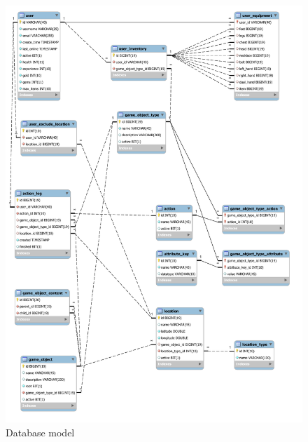 	\begin{figure}[h]	
		\includegraphics[width=\textwidth]{figures/DatabaseModel}
		\centering
		\caption{Database model}
		\label{fig:dbmodel}	
	\end{figure}
	
